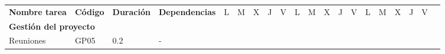 \begin{longtable}[c]{llclllllllllllllllll}
        \multicolumn{1}{|c|}{\multirow{-2}{*}{\textbf{Nombre tarea}}}                                                           & \multicolumn{1}{c|}{\multirow{-2}{*}{\textbf{Código}}}                         & \multicolumn{1}{c|}{\multirow{-2}{*}{\textbf{Duración}}}                         & \multicolumn{1}{c|}{\multirow{-2}{*}{\textbf{Dependencias}}}                         & \multicolumn{1}{l|}{L}          & \multicolumn{1}{l|}{M}          & \multicolumn{1}{l|}{X}          & \multicolumn{1}{l|}{J}          & \multicolumn{1}{l|}{V}          & \multicolumn{1}{l|}{L}          & \multicolumn{1}{l|}{M}          & \multicolumn{1}{l|}{X}          & \multicolumn{1}{l|}{J}          & \multicolumn{1}{l|}{V}          & \multicolumn{1}{l|}{L}          & \multicolumn{1}{l|}{M}          & \multicolumn{1}{l|}{X}          & \multicolumn{1}{l|}{J}          & \multicolumn{1}{l|}{V}                        &  \\ \cline{1-19}
        \multicolumn{4}{|l|}{\textbf{Gestión del proyecto}}                                                                                                                                                                                                                                                                                                                                & \multicolumn{15}{l|}{}                                                                                                                                                                                                                                                                                                                                                                                                                                                                                                                    &  \\ \cline{1-19}
        \multicolumn{1}{|l|}{Reuniones}                                                                                         & \multicolumn{1}{l|}{GP05}                                                      & \multicolumn{1}{l|}{0.2}                                                         & \multicolumn{1}{l|}{-}                                                               &                                 &                                 &                                 &                                 &                                 &                                 &                                 &                                 & \cellcolor[HTML]{EF8787}        &                                 &                                 &                                 &                                 &                                 & \multicolumn{1}{l|}{}                         &  \\ \cline{1-4}

\end{longtable}
